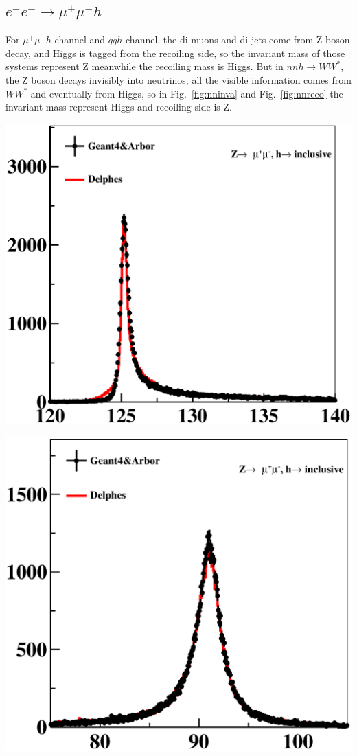 \documentclass[a4paper,10pt,twoside]{cpc-hepnp}
\begin{document}
\subsection{$e^+e^-\to \mu^+\mu^-h$} For $\mu^+\mu^-h$ channel and $q\bar{q}h$ channel, the di-muons and di-jets come from Z boson decay, and Higgs is tagged from the recoiling side, so the invariant mass of those systems represent Z meanwhile the recoiling mass is Higgs. But in $nnh\to WW^*$, the Z boson decays invisibly into neutrinos, all the visible information comes from $WW^*$ and eventually from Higgs, so in Fig.~\ref{fig:nninva} and Fig.~\ref{fig:nnreco} the invariant mass represent Higgs and recoiling side is Z.

\begin{center}
\includegraphics[width=0.9\linewidth]{e2e2h_reco}
\end{center}
\begin{center}
\includegraphics[width=0.9\linewidth]{e2e2h_mass}
\end{center}
\end{document}

